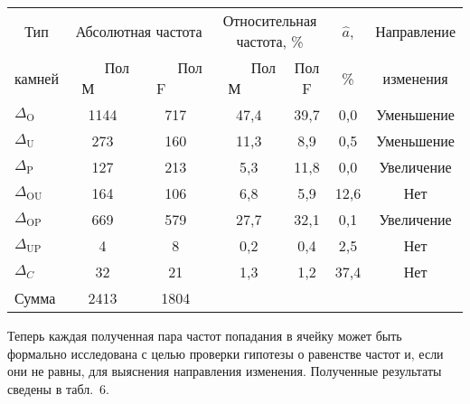 \begin{multicols}{2}
\begin{table*}
\begin{center}
\begin{tabular}{|l|c|c|c|c|c|c|}
\hline
\multicolumn{1}{|c|}{Тип}&
\multicolumn{2}{c|}{Абсолютная частота}&\multicolumn{2}{c|}{Относительная 
частота, \%}&$\hat{a}$, &Направление\\
\cline{2-5}
\multicolumn{1}{|c|}{камней}&\ \ \ \ Пол М\ \ \ \ &\ \ \ \ Пол F\ \ \ \ &\ \ \ \ Пол М\ \ \ \ &Пол F&\%& изменения\\
\hline
\hspace*{3mm}$\Delta_{\mathrm{O}}$&1144\hphantom{9}&717&47,4&39,7&0,0&Уменьшение\\
\hspace*{3mm}$\Delta_{\mathrm{U}}$&273&160&11,3&\hphantom{9}8,9&0,5&Уменьшение\\
\hspace*{3mm}$\Delta_{\mathrm{P}}$&127&213&\hphantom{9}5,3&11,8&0,0&Увеличение\\
\hspace*{3mm}$\Delta_{\mathrm{OU}}$&164&106&\hphantom{9}6,8&\hphantom{9}5,9&12,6\hphantom{9}&Нет\\
\hspace*{3mm}$\Delta_{\mathrm{OP}}$&669&579&27,7&32,1&0,1&Увеличение\\
\hspace*{3mm}$\Delta_{\mathrm{UP}}$&\hphantom{99}4&\hphantom{99}8&\hphantom{9}0,2&\hphantom{9}0,4&2,5&Нет\\
\hspace*{3mm}$\Delta_{C}$&\hphantom{9}32&\hphantom{9}21&\hphantom{9}1,3&\hphantom{9}1,2&37,4\hphantom{9}&Нет\\
\hline
Сумма&2413\hphantom{9}&1804\hphantom{9}&&&&\\
\hline
\end{tabular}
\end{center}
\end{table*}



     
      Теперь каждая полученная пара частот попадания в ячейку может быть формально 
исследована  с целью проверки гипотезы о равенстве частот и, если они не равны, для 
выяснения направления изменения. Полученные результаты сведены в табл.~6.

\begin{table*}[b]\small
\begin{center}
\parbox{355pt}{
}


\vspace*{2ex}


\end{center}
\end{table*}
\end{multicols}
